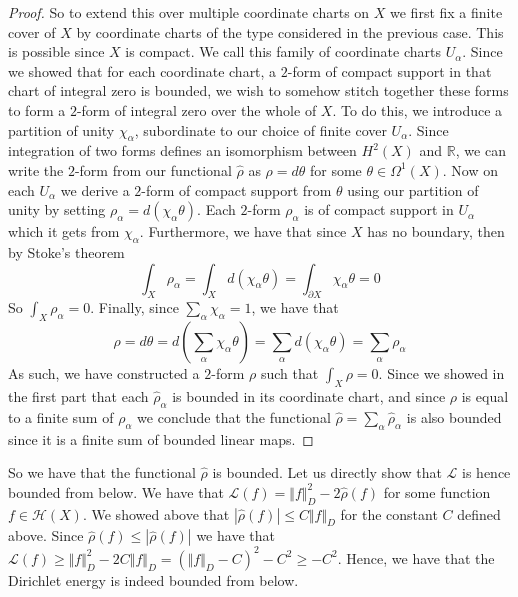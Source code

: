 \documentclass[11pt]{report}
\theoremstyle{definition}
\begin{document}
\begin{proof}
  So to extend this over multiple coordinate charts on $X$ we first fix a finite cover of $X$ by coordinate charts of the type considered in the previous case. This is possible since $X$ is compact. We call this family of coordinate charts $U_{\alpha}$. Since we showed that for each coordinate chart, a $2$-form of compact support in that chart of integral zero is bounded, we wish to somehow stitch together these forms to form a $2$-form of integral zero over the whole of $X$. To do this, we introduce a partition of unity $\chi_{\alpha}$, subordinate to our choice of finite cover $U_{\alpha}$. Since integration of two forms defines an isomorphism between $H^2(X)$ and $\mathbb{R}$, we can write the $2$-form from our functional $\hat{\rho}$ as $\rho = d\theta$ for some $\theta \in \Omega^1(X)$. Now on each $U_{\alpha}$ we derive a $2$-form of compact support from $\theta$ using our partition of unity by setting $\rho_{\alpha} = d(\chi_{\alpha}\theta)$. Each $2$-form $\rho_{\alpha}$ is of compact support in $U_{\alpha}$ which it gets from $\chi_{\alpha}$. Furthermore, we have that since $X$ has no boundary, then by Stoke's theorem
  \[ \int_X\rho_{\alpha} = \int_X d(\chi_{\alpha}\theta) = \int_{\partial X} \chi_{\alpha}\theta = 0 \]
  So $\int_X \rho_{\alpha} = 0$. Finally, since $\sum_{\alpha} \chi_{\alpha} = 1$, we have that 
  \[ \rho = d\theta = d\left(\sum_{\alpha}\chi_{\alpha}\theta\right) = \sum_{\alpha}d(\chi_{\alpha}\theta) = \sum_{\alpha}\rho_{\alpha}\]
  As such, we have constructed a $2$-form $\rho$ such that $\int_X \rho = 0$. Since we showed in the first part that each $\hat{\rho}_{\alpha}$ is bounded in its coordinate chart, and since $\rho$ is equal to a finite sum of $\rho_{\alpha}$ we conclude that the functional $\hat{\rho} = \sum_{\alpha}\hat{\rho}_{\alpha}$ is also bounded since it is a finite sum of bounded linear maps.
\end{proof}

So we have that the functional $\hat{\rho}$ is bounded. Let us directly show that $\mathcal{L}$ is hence bounded from below.
We have that $\mathcal{L}(f) = \Vert f \Vert^2_D -2\hat{\rho}(f) $ for some function $f \in \mathcal{H}(X)$. We showed above that $|\hat{\rho}(f)| \leq C \Vert f \Vert_D$ for the constant $C$ defined above. Since $\hat{\rho}(f) \leq |\hat{\rho}(f)|$ we have that $ \mathcal{L}(f) \geq \Vert f \Vert^2_D -2C \Vert f \Vert_D = (\Vert f \Vert_D - C)^2 - C^2 \geq - C^2$. Hence, we have that the Dirichlet energy is indeed bounded from below.
\end{document}
